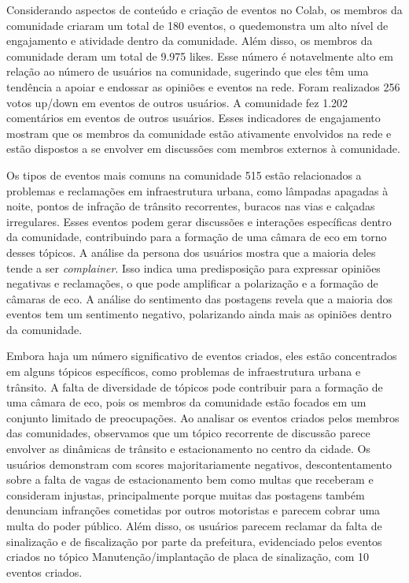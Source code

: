 Considerando aspectos de conteúdo e criação de eventos no Colab, os membros da comunidade criaram um total de 180 eventos, o quedemonstra um alto nível de engajamento e atividade dentro da comunidade. Além disso, os membros da comunidade deram um total de 9.975 likes. Esse número é notavelmente alto em relação ao número de usuários na comunidade, sugerindo que eles têm uma tendência a apoiar e endossar as opiniões e eventos na rede. Foram realizados 256 votos up/down em eventos de outros usuários. A comunidade fez 1.202 comentários em eventos de outros usuários. Esses indicadores de engajamento mostram que os membros da comunidade estão ativamente envolvidos na rede e estão dispostos a se envolver em discussões com membros externos à comunidade.

Os tipos de eventos mais comuns na comunidade 515 estão relacionados a problemas e reclamações em infraestrutura urbana, como lâmpadas apagadas à noite, pontos de infração de trânsito recorrentes, buracos nas vias e calçadas irregulares. Esses eventos podem gerar discussões e interações específicas dentro da comunidade, contribuindo para a formação de uma câmara de eco em torno desses tópicos. A análise da persona dos usuários mostra que a maioria deles tende a ser \textit{complainer}. Isso indica uma predisposição para expressar opiniões negativas e reclamações, o que pode amplificar a polarização e a formação de câmaras de eco. A análise do sentimento das postagens revela que a maioria dos eventos tem um sentimento negativo, polarizando ainda mais as opiniões dentro da comunidade.

Embora haja um número significativo de eventos criados, eles estão concentrados em alguns tópicos específicos, como problemas de infraestrutura urbana e trânsito. A falta de diversidade de tópicos pode contribuir para a formação de uma câmara de eco, pois os membros da comunidade estão focados em um conjunto limitado de preocupações. Ao analisar os eventos criados pelos membros das comunidades, observamos que um tópico recorrente de discussão parece envolver as dinâmicas de trânsito e estacionamento no centro da cidade. Os usuários demonstram com scores majoritariamente negativos, descontentamento sobre a falta de vagas de estacionamento bem como multas que receberam e consideram injustas, principalmente porque muitas das postagens também denunciam infranções cometidas por outros motoristas e parecem cobrar uma multa do poder público. Além disso, os usuários parecem reclamar da falta de sinalização e de fiscalização por parte da prefeitura, evidenciado pelos eventos criados no tópico Manutenção/implantação de placa de sinalização, com 10 eventos criados.

